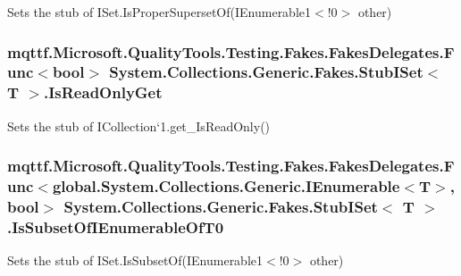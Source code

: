 Sets the stub of I\-Set{.\-Is\-Proper\-Superset\-Of(I\-Enumerable}1$<$!0$>$ other)

\hypertarget{class_system_1_1_collections_1_1_generic_1_1_fakes_1_1_stub_i_set_3_01_t_01_4_afa7bd8aed11b6fe9eaa44f1f4e8b08c0}{
\subsubsection[{Is\-Read\-Only\-Get}]{\setlength{\rightskip}{0pt plus 5cm}mqttf.\-Microsoft.\-Quality\-Tools.\-Testing.\-Fakes.\-Fakes\-Delegates.\-Func$<$bool$>$ System.\-Collections.\-Generic.\-Fakes.\-Stub\-I\-Set$<$ T $>$.Is\-Read\-Only\-Get}}\label{class_system_1_1_collections_1_1_generic_1_1_fakes_1_1_stub_i_set_3_01_t_01_4_afa7bd8aed11b6fe9eaa44f1f4e8b08c0}


Sets the stub of I\-Collection`1.get\-\_\-\-Is\-Read\-Only()

\hypertarget{class_system_1_1_collections_1_1_generic_1_1_fakes_1_1_stub_i_set_3_01_t_01_4_aa061794468da98b069f6344e2accb2e8}{
\subsubsection[{Is\-Subset\-Of\-I\-Enumerable\-Of\-T0}]{\setlength{\rightskip}{0pt plus 5cm}mqttf.\-Microsoft.\-Quality\-Tools.\-Testing.\-Fakes.\-Fakes\-Delegates.\-Func$<$global.\-System.\-Collections.\-Generic.\-I\-Enumerable$<$T$>$, bool$>$ System.\-Collections.\-Generic.\-Fakes.\-Stub\-I\-Set$<$ T $>$.Is\-Subset\-Of\-I\-Enumerable\-Of\-T0}}\label{class_system_1_1_collections_1_1_generic_1_1_fakes_1_1_stub_i_set_3_01_t_01_4_aa061794468da98b069f6344e2accb2e8}


Sets the stub of I\-Set{.\-Is\-Subset\-Of(I\-Enumerable}1$<$!0$>$ other)

